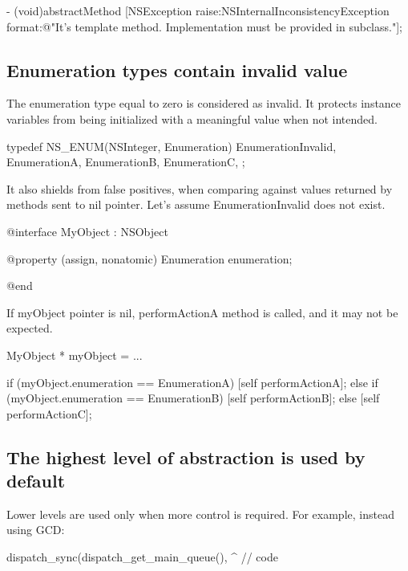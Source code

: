 \documentclass[10pt]{extarticle}
\newenvironment{codelisting}
{\footnotesize\mdframed[middlelinewidth=0.5pt, middlelinecolor=BaliHaiColor, skipabove=15pt]\verbatim}
{\endverbatim\endmdframed\vspace{12pt}\normalsize}
\begin{document}
\begin{codelisting}
- (void)abstractMethod
{
    [NSException raise:NSInternalInconsistencyException 
                format:@"It's template method. Implementation must be provided in subclass."];
}
\end{codelisting}


\subsection{Enumeration types contain invalid value}

The enumeration type equal to zero is considered as invalid. It protects instance variables from being initialized with a meaningful value when not intended.

\begin{codelisting}
typedef NS_ENUM(NSInteger, Enumeration) {
    EnumerationInvalid,
    EnumerationA,
    EnumerationB,
    EnumerationC,
};
\end{codelisting}

It also shields from false positives, when comparing against values returned by methods sent to nil pointer. Let's assume EnumerationInvalid does not exist.

\begin{codelisting}
@interface MyObject : NSObject

@property (assign, nonatomic) Enumeration enumeration;

@end
\end{codelisting}

If myObject pointer is nil, performActionA method is called, and it may not be expected.

\begin{codelisting}
MyObject * myObject = ...

if (myObject.enumeration == EnumerationA)
    [self performActionA];
else if (myObject.enumeration == EnumerationB)
    [self performActionB];
else
    [self performActionC];
\end{codelisting}


\subsection{The highest level of abstraction is used by default}

Lower levels are used only when more control is required. For example, instead using GCD:

\begin{codelisting}
dispatch_sync(dispatch_get_main_queue(), ^{
    // code
}
\end{codelisting}
\end{document}
